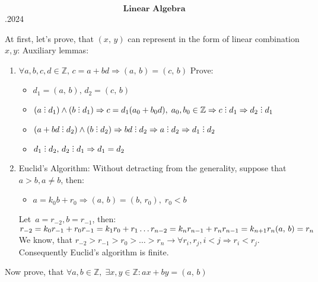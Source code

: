 \documentclass[12pt, a4paper]{article}
\DeclareRobustCommand{\divby}{%
	\mathrel{\text{\vbox{\baselineskip.65ex\lineskiplimit0pt\hbox{.}\hbox{.}\hbox{.}}}}%
}
\begin{document}
	\begin{center}
		\LARGE
		\[\textbf{Linear Algebra}\].2024
	\end{center}
	\centering
	\Large
	\begin{flushleft}
		At first, let's prove, that \((x,\,y)\) can represent in the form of linear combination \(x,y\):\newline
		Auxiliary lemmas:
		\begin{enumerate}
			\item \(\forall a,b,c,d \in \mathbb{Z},\, c = a + bd\Rightarrow (a,\,b) = (c,\,b)\)\newline
			Prove:
			\begin{itemize}
				\item \(d_1 = (a,\,b),\,d_2=(c,\,b)\)
				\item \((a\divby d_1) \land (b \divby d_1)\Rightarrow\newline c=d_1(a_0+b_0d), \;a_0, b_0\in\mathbb{Z}\Rightarrow c \divby d_1 \Rightarrow d_2\divby d_1 \)
				\item  \((a+bd \divby d_2) \land (b \divby d_2) \Rightarrow
				bd \divby d_2\Rightarrow a \divby d_2\Rightarrow d_1 \divby d_2\)
				\item \(d_1 \divby d_2,\,d_2 \divby d_1 \Rightarrow d_1 = d_2\)
			\end{itemize}
			\item Euclid's Algorithm:\newline
			Without detracting from the generality, suppose that \(a > b, a \neq b\), then:
			\begin{itemize}
				\item \(a = k_0b + r_0 \Rightarrow (a,\,b) = (b,\,r_0),\;r_0 < b\)
			\end{itemize}
			Let~\(a=r_{-2},b=r_{-1}\), then:\newline
			\(r_{-2}=k_0r_{-1}+r_0\newline r_{-1}=k_1r_0+r_1\newline\ldots\newline r_{n-2}=k_{n}r_{n-1}+r_n\newline 
			r_{n-1}=k_{n+1}r_n\newline
			(a,\,b) = r_n\)\newline
			We know, that \(r_{-2}>r_{-1}>r_{0}>\ldots>r_n \rightarrow \forall r_i, r_j, i<j \Rightarrow r_i < r_j\). \newline Consequently Euclid's algorithm is finite.
		\end{enumerate}
		Now prove, that \(\forall a,b \in\mathbb{Z},\;\exists x,y\in\mathbb{Z}: ax+by=(a,\,b)\)

\end{flushleft}
\end{document}
